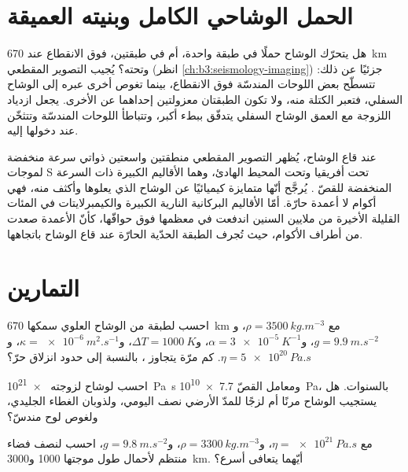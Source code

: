\section{الحمل الوشاحي الكامل وبنيته العميقة}

هل يتحرّك الوشاح حملًا في طبقة واحدة، أم في طبقتين، فوق الانقطاع
عند \qty{670}{km} وتحته؟ يُجيب التصوير المقطعي (انظر \cref{ch:b3:seismology-imaging})
جزئيًا عن ذلك: تتسطّح بعض اللوحات المندسّة فوق الانقطاع، بينما تغوص أخرى
عبره إلى الوشاح السفلي، فتعبر الكتلة منه، ولا تكون الطبقتان
معزولتين إحداهما عن الأخرى. يجعل ازدياد اللزوجة مع العمق الوشاح السفلي
يتدفّق ببطء أكبر، وتتباطأ اللوحات المندسّة وتتثخّن عند دخولها إليه.

عند قاع الوشاح، يُظهر التصوير المقطعي منطقتين واسعتين ذواتي سرعة منخفضة لموجات S
تحت أفريقيا وتحت المحيط الهادئ، وهما الأقاليم الكبيرة ذات السرعة المنخفضة للقصّ
. يُرجَّح أنّها متمايزة كيميائيًا عن الوشاح الذي يعلوها
وأكثف منه، فهي أكوام لا أعمدة حارّة. أمّا الأقاليم البركانية النارية الكبيرة
والكيمبرلايتات في المئات القليلة الأخيرة من ملايين السنين اندفعت في معظمها فوق
حوافّها، كأنّ الأعمدة صعدت من أطراف الأكوام، حيث تُجرف الطبقة الحدّية
الحارّة عند قاع الوشاح باتجاهها.

\section{التمارين}

\begin{exercise}[$\star$]\label{exo:b3:mantle-convection:1}
احسب  لطبقة من الوشاح العلوي سمكها \qty{670}{km} مع
$\rho = \qty{3500}{kg.m^{-3}}$، و$g = \qty{9.9}{m.s^{-2}}$، و$\alpha =
\qty{3e-5}{K^{-1}}$، و$\Delta T = \qty{1000}{K}$، و$\kappa =
\qty{e-6}{m^2.s^{-1}}$، و$\eta = \qty{5e20}{Pa.s}$. كم مرّة يتجاوز
، بالنسبة إلى حدود انزلاق حرّ؟
\end{exercise}

\begin{exercise}[$\star$]\label{exo:b3:mantle-convection:2}
احسب  لوشاح لزوجته \qty{e21}{Pa.s} ومعامل
القصّ \qty{7.7e10}{Pa}، بالسنوات. هل يستجيب الوشاح مرنًا أم
لزجًا للمدّ الأرضي نصف اليومي، ولذوبان الغطاء الجليدي، ولغوص
لوح مندسّ؟
\end{exercise}

\begin{exercise}[$\star$]\label{exo:b3:mantle-convection:3}
مع $\eta = \qty{e21}{Pa.s}$، و$\rho = \qty{3300}{kg.m^{-3}}$، و$g =
\qty{9.8}{m.s^{-2}}$، احسب  لنصف فضاء منتظم
لأحمال طول موجتها 1000 و\qty{3000}{km}. أيّهما يتعافى أسرع؟
\end{exercise}

